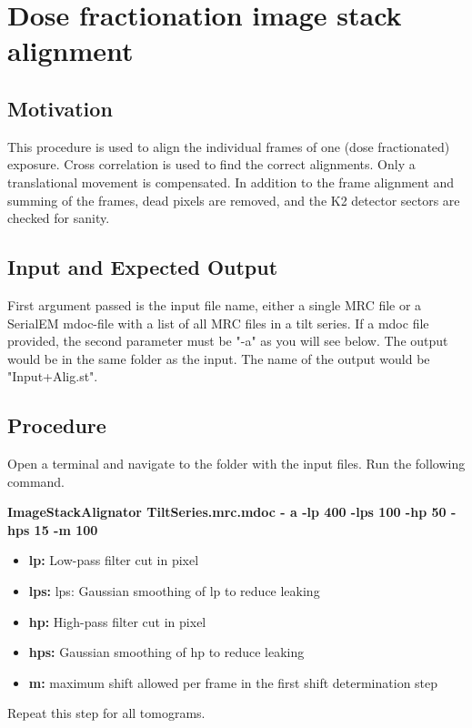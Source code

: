 \documentclass[12pt,a4paper]{scrartcl}
\begin{document}
\newpage
\section{Dose fractionation image stack alignment} 

\subsection{Motivation}

This procedure is used to align the individual frames of one 
(dose fractionated) exposure. Cross correlation is used to find 
the correct alignments. Only a translational movement is compensated. 
In addition to the frame alignment and summing of the frames, 
dead pixels are removed, and the K2 detector sectors are checked 
for sanity.

\subsection{Input and Expected Output}
First argument passed is the input file name, either a single MRC file or a SerialEM mdoc-file with a list of all MRC files in a tilt series. If a mdoc file provided, the second parameter must be "-a" as you will see below. The output would be in the same folder as the input. The name of the output would be "Input+Alig.st".

\subsection{Procedure}

Open a terminal and navigate to the folder with the input files. Run the following command.


\textbf{ImageStackAlignator TiltSeries.mrc.mdoc - a -lp 400 -lps 100 -hp 50 			-hps 15 -m 100 }
\begin{itemize}


\item\textbf{lp:} Low-pass filter cut in pixel
\item\textbf{lps:} lps: Gaussian smoothing of lp to reduce leaking
\item\textbf{hp:} High-pass filter cut in pixel
\item\textbf{hps:} Gaussian smoothing of hp to reduce leaking
\item\textbf{m:} maximum shift allowed per frame in the first shift determination step 
\end{itemize}

Repeat this step for all tomograms. 
\end{document}
